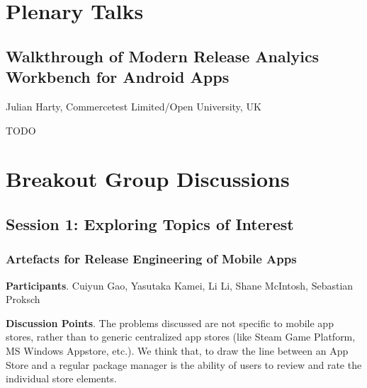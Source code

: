 \documentclass[a4paper]{article}
\newcommand{\smallsection}[1]{\noindent \textbf{#1}. }
\begin{document}
\clearpage

\section{Plenary Talks}

\subsection{Walkthrough of Modern Release Analyics Workbench for Android Apps}

Julian Harty, Commercetest Limited/Open University, UK

TODO

\clearpage

\section{Breakout Group Discussions}

\subsection{Session 1: Exploring Topics of Interest}

\subsubsection{Artefacts for Release Engineering of Mobile Apps}

\smallsection{Participants}
Cuiyun Gao, Yasutaka Kamei, Li Li, Shane McIntosh, Sebastian Proksch

\smallsection{Discussion Points}
The problems discussed are not specific to mobile app stores, rather than to generic centralized app stores (like Steam Game Platform, MS Windows Appstore, etc.). We think that, to draw the line between an App Store and a regular package manager is the ability of users to review and rate the individual store elements.
\end{document}
